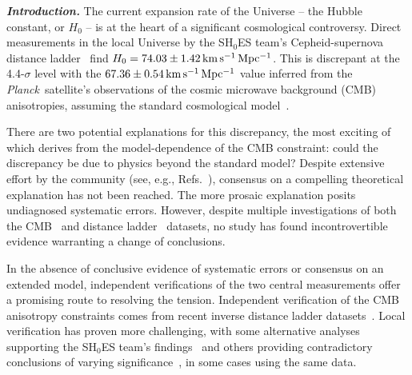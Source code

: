 \documentclass[%
 reprint,
 superscriptaddress,
 nofootinbib,
 amsmath,amssymb,
 aps,
]{revtex4-2}
\newcommand{\hubble}{\ensuremath{H_0}}
\newcommand{\kmsmpc}{\ensuremath{{\rm km\,s^{-1}\,Mpc^{-1}}}}
\newcommand{\planck}{{\it Planck}}
\begin{document}

\maketitle



\textbf{\emph{ Introduction.}} The current expansion rate of the Universe -- the Hubble constant, or $H_0$ -- is at the heart of a significant cosmological controversy. Direct measurements in the local Universe by the SH$_0$ES team's Cepheid-supernova distance ladder~\cite{Riess_etal:2019} find $\hubble = 74.03 \pm 1.42 \,\kmsmpc$. This is discrepant at the 4.4-$\sigma$ level with the $67.36 \pm 0.54\,\kmsmpc$ value inferred from the \planck\ satellite's observations of the cosmic microwave background (CMB) anisotropies, assuming the standard cosmological model~\cite{Planck_VI:2018}.

There are two potential explanations for this discrepancy, the most exciting of which derives from the model-dependence of the CMB constraint: could the discrepancy be due to physics beyond the standard model? Despite extensive effort by the community (see, e.g., Refs.~\cite{Knox_Millea:2020,Vagnozzi:2020}), consensus on a compelling theoretical explanation has not been reached. The more prosaic explanation posits undiagnosed systematic errors. However, despite multiple investigations of both the CMB~\cite{Spergel_etal:2015,Addison_etal:2016,Obied_etal:2017,Calabrese_etal:2017,Efstathiou_Gratton:2019,Motloch_Hu:2020,ACT:2020} and distance ladder~\cite{Efstathiou:2014,Rigault_etal:2015,Jones_etal:2015,Cardona_etal:2016,Zhang_etal:2017,Follin_Knox:2017,Feeney_etal:2017,Wu_Huterer:2017,Dhawan_etal:2017,Bengaly_etal:2018,Rigault_etal:2018,Jones_etal:2018,Riess_etal:2020,Efstathiou:2020} datasets, no study has found incontrovertible evidence warranting a change of conclusions.

In the absence of conclusive evidence of systematic errors or consensus on an extended model, independent verifications of the two central measurements offer a promising route to resolving the tension. Independent verification of the CMB anisotropy constraints comes from recent inverse distance ladder datasets~\cite{Addison_etal:2017,DES_H_0:2017,Philcox_etal:2020}. Local verification has proven more challenging, with some alternative analyses supporting the SH$_0$ES team's findings~\cite{Yuan_etal:2019,Huang_etal:2020,H0LICOW_XIII:2020,TDCOSMO_I:2020,Pesce_etal:2020} and others providing contradictory conclusions of varying significance~\cite{Freedman_etal:2019,Freedman_etal:2020,TDCOSMO_IV:2020,Boruah_etal:2020}, in some cases using the same data.
\end{document}

